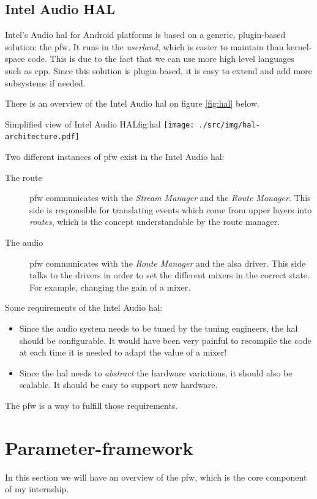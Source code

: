 \subsection{Intel Audio HAL}
Intel's Audio \gls{hal} for Android platforms is based on a generic, plugin-based solution: the \gls{pfw}.
It runs in the \emph{userland}, which is easier to maintain than kernel-space code. This is due
to the fact that we can use more high level languages such as \gls{cpp}.
Since this solution is plugin-based, it is easy to extend and add more subsystems if needed.

There is an overview of the Intel Audio \gls{hal} on figure \ref{fig:hal} below.
\begin{figureGraphics}{Simplified view of Intel Audio HAL}{fig:hal}
    \texttt{[image: ./src/img/hal-architecture.pdf]}
\end{figureGraphics}
Two different instances of \gls{pfw} exist in the Intel Audio \gls{hal}:
\begin{description}
    \item[The route] \gls{pfw} communicates with the \emph{Stream Manager} and the \emph{Route Manager}.
        This side is responsible for translating events which come from upper layers into \emph{routes}, which
        is the concept understandable by the route manager.
    \item[The audio] \gls{pfw} communicates with the \emph{Route Manager} and the \gls{alsa} driver.
        This side talks to the drivers in order to set the different mixers in the correct state. For example,
        changing the gain of a mixer.
\end{description}

Some requirements of the Intel Audio \gls{hal}:
\begin{itemize}
    \item Since the audio system needs to be tuned by the tuning engineers, the \gls{hal} should be configurable.
        It would have been very painful to recompile the code at each time it is needed to adapt the value of a mixer!
    \item Since the \gls{hal} needs to \emph{abstract} the hardware variations, it should also be scalable. It should be
        easy to support new hardware.
\end{itemize}

The \gls{pfw} is a way to fulfill those requirements.


\section{Parameter-framework}
\label{sec:parameter-framework}
In this section we will have an overview of the \gls{pfw}, which is the core component of my internship.


